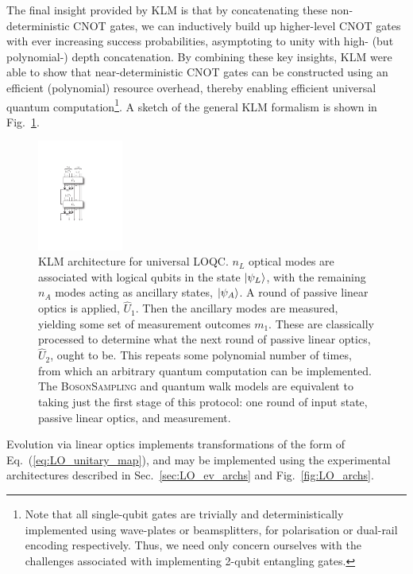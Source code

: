 The final insight provided by KLM is that by concatenating these non-deterministic CNOT gates, we can inductively build up higher-level CNOT gates with ever increasing success probabilities, asymptoting to unity with high- (but polynomial-) depth concatenation. By combining these key insights, KLM were able to show that near-deterministic CNOT gates can be constructed using an efficient (polynomial) resource overhead, thereby enabling efficient universal quantum computation\footnote{Note that all single-qubit gates are trivially and deterministically implemented using wave-plates or beamsplitters, for polarisation or dual-rail encoding respectively. Thus, we need only concern ourselves with the challenges associated with implementing 2-qubit entangling gates.}. A sketch of the general KLM formalism is shown in Fig.~\ref{fig:KLM_protocol}.

\begin{figure}[!htb]
\includegraphics[width=0.25\textwidth]{KLM}
\caption{KLM architecture for universal LOQC. $n_L$ optical modes are associated with logical qubits in the state $|\psi_L\rangle$, with the remaining $n_A$ modes acting as ancillary states, $|\psi_A\rangle$. A round of passive linear optics is applied, $\hat{U}_1$. Then the ancillary modes are measured, yielding some set of measurement outcomes $m_1$. These are classically processed to determine what the next round of passive linear optics, $\hat{U}_2$, ought to be. This repeats some polynomial number of times, from which an arbitrary quantum computation can be implemented. The \textsc{BosonSampling} and quantum walk models are equivalent to taking just the first stage of this protocol: one round of input state, passive linear optics, and measurement.} \label{fig:KLM_protocol}
\end{figure}

Evolution via linear optics implements transformations of the form of Eq.~(\ref{eq:LO_unitary_map}), and may be implemented using the experimental architectures described in Sec.~\ref{sec:LO_ev_archs} and Fig.~\ref{fig:LO_archs}.

